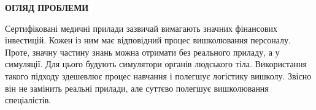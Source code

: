 

















\begin{center}
  \textbf{ОГЛЯД ПРОБЛЕМИ}
\end{center}
Сертифіковані медичні прилади зазвичай вимагають значних фінансових інвестицій. Кожен із ним має відповідний процес
вишколювання персоналу. Проте, значну частину знань можна отримати без реального приладу, а у симуляції. Для цього
будують симулятори органів людського тіла. Використання такого підходу здешевлює процес навчання і полегшує логістику
вишколу. Звісно він не замінить реальні прилади, але суттєво полегшує вишколювання спеціалістів.

